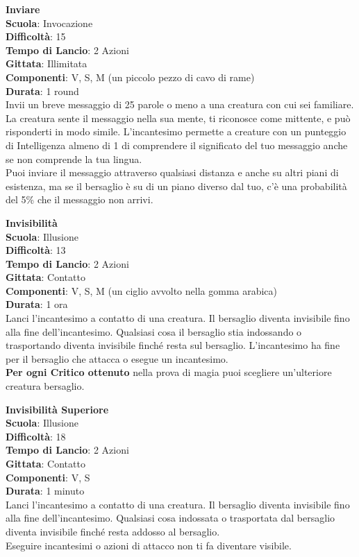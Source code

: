 \begin{multicols}{2}
\medskip\textbf{Inviare}\\
\textbf{Scuola}: Invocazione\\
\textbf{Difficoltà}: 15\\
\textbf{Tempo di Lancio}: 2 Azioni\\
\textbf{Gittata}: Illimitata\\
\textbf{Componenti}: V, S, M (un piccolo pezzo di cavo di rame)\\
\textbf{Durata}: 1 round\\
Invii un breve messaggio di 25 parole o meno a una creatura con cui sei familiare. La creatura sente il messaggio nella sua mente, ti riconosce come mittente, e può risponderti in modo simile. L'incantesimo permette a creature con un punteggio di Intelligenza almeno di 1 di comprendere il significato del tuo messaggio anche se non comprende la tua lingua.\\
Puoi inviare il messaggio attraverso qualsiasi distanza e anche su altri piani di esistenza, ma se il bersaglio è su di un piano diverso dal tuo, c'è una probabilità del 5\% che il messaggio non arrivi.

\medskip\textbf{Invisibilità}\\
\textbf{Scuola}: Illusione\\
\textbf{Difficoltà}: 13\\
\textbf{Tempo di Lancio}: 2 Azioni\\
\textbf{Gittata}: Contatto\\
\textbf{Componenti}: V, S, M (un ciglio avvolto nella gomma arabica)\\
\textbf{Durata}: 1 ora \\
Lanci l'incantesimo a contatto di una creatura. Il bersaglio diventa invisibile fino alla fine dell'incantesimo. Qualsiasi cosa il bersaglio stia indossando o trasportando diventa invisibile finché resta sul bersaglio. L'incantesimo ha fine per il bersaglio che attacca o esegue un incantesimo.\\
\textbf{Per ogni Critico ottenuto} nella prova di magia puoi scegliere un'ulteriore creatura bersaglio.

\medskip\textbf{Invisibilità Superiore}\\
\textbf{Scuola}: Illusione\\
\textbf{Difficoltà}: 18\\
\textbf{Tempo di Lancio}: 2 Azioni\\
\textbf{Gittata}: Contatto\\
\textbf{Componenti}: V, S\\
\textbf{Durata}: 1 minuto\\
Lanci l'incantesimo a contatto di una creatura. Il bersaglio diventa invisibile fino alla fine dell'incantesimo. Qualsiasi cosa indossata o trasportata dal bersaglio diventa invisibile finché resta addosso al bersaglio.\\
Eseguire incantesimi o azioni di attacco non ti fa diventare visibile.


\end{multicols}

